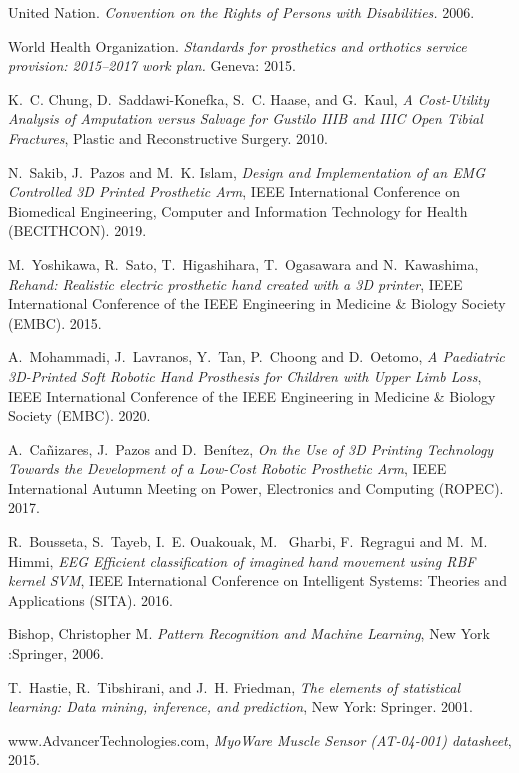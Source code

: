 \documentclass[conference]{IEEEtran}
\begin{document}
\begin{thebibliography}{1}


United Nation. \emph{Convention on the Rights of Persons with Disabilities.} 2006.

World Health Organization. \emph{Standards for prosthetics and orthotics service provision: 2015–2017 work plan.} Geneva: 2015.

K.~C. Chung, D.~Saddawi-Konefka, S.~C. Haase, and G.~Kaul, \emph{A Cost-Utility Analysis of Amputation versus Salvage for Gustilo IIIB and IIIC Open Tibial Fractures}, Plastic and Reconstructive Surgery. 2010.

N.~Sakib, J.~Pazos and M.~K. Islam, \emph{Design and Implementation of an EMG Controlled 3D Printed Prosthetic Arm}, IEEE International Conference on Biomedical Engineering, Computer and Information Technology for Health (BECITHCON). 2019.

M.~Yoshikawa, R.~Sato, T.~Higashihara, T.~Ogasawara and N.~Kawashima, \emph{Rehand: Realistic electric prosthetic hand created with a 3D printer}, IEEE International Conference of the IEEE Engineering in Medicine & Biology Society (EMBC). 2015.

A.~Mohammadi, J.~Lavranos, Y.~Tan, P.~Choong and D.~Oetomo, \emph{A Paediatric 3D-Printed Soft Robotic Hand Prosthesis for Children with Upper Limb Loss}, IEEE International Conference of the IEEE Engineering in Medicine & Biology Society (EMBC). 2020.

A.~Cañizares, J.~Pazos and D.~Benítez, \emph{On the Use of 3D Printing Technology Towards the
Development of a Low-Cost Robotic Prosthetic Arm}, IEEE International Autumn Meeting on Power, Electronics and Computing (ROPEC). 2017.

R.~Bousseta, S.~Tayeb, I.~E. Ouakouak, M.~ Gharbi, F.~Regragui and M.~M. Himmi, \emph{EEG Efficient classification of imagined hand
movement using RBF kernel SVM}, IEEE International Conference on Intelligent Systems: Theories and Applications (SITA). 2016.

Bishop, Christopher M. \emph{Pattern Recognition and Machine Learning}, New York :Springer, 2006.

T.~Hastie, R.~Tibshirani, and J.~H. Friedman, \emph{The elements of statistical learning: Data mining, inference, and prediction}, New York: Springer. 2001.

www.AdvancerTechnologies.com, \emph{MyoWare Muscle Sensor (AT-04-001) datasheet}, 2015.

\end{thebibliography}
\end{document}

